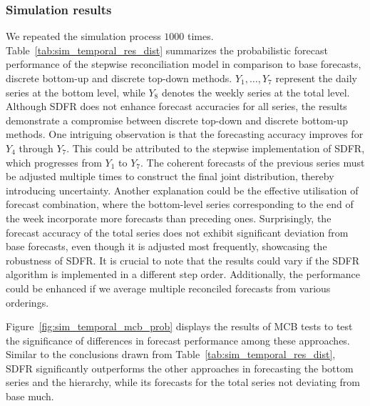 \documentclass[a4paper,review,12pt,authoryear]{elsarticle}
\begin{document}
     \subsubsection{Simulation results}
     We repeated the simulation process $1000$ times.
     Table~\ref{tab:sim_temporal_res_dist} summarizes the probabilistic forecast performance of the stepwise reconciliation model in comparison to base forecasts, discrete bottom-up and discrete top-down methods.
     $Y_1,\dots,Y_7$ represent the daily series at the bottom level, while $Y_8$ denotes the weekly series at the total level.
     Although SDFR does not enhance forecast accuracies for all series, the results
     demonstrate a compromise between discrete top-down and discrete bottom-up methods.
     One intriguing observation is that the forecasting accuracy improves for $Y_4$ through $Y_7$.
     This could be attributed to the stepwise implementation of SDFR, which progresses from $Y_1$ to $Y_7$. The coherent forecasts of the previous series must be adjusted multiple times to construct the final joint distribution, thereby introducing uncertainty.
     Another explanation could be the effective utilisation of forecast combination, where the bottom-level series corresponding to the end of the week incorporate more forecasts than preceding ones.
     Surprisingly, the forecast accuracy of the total series does not exhibit significant deviation from base forecasts,  even though it is adjusted most frequently, showcasing the robustness of SDFR.
     It is crucial to note that the results could vary if the SDFR algorithm is implemented in a different step order.
     Additionally, the performance could be enhanced if we average multiple reconciled forecasts from various orderings.

     Figure~\ref{fig:sim_temporal_mcb_prob} displays the results of MCB tests to test the significance of differences in forecast performance among these approaches. Similar to the conclusions drawn from Table~\ref{tab:sim_temporal_res_dist}, SDFR significantly outperforms the other approaches in forecasting the bottom series and the hierarchy, while its forecasts for the total series not deviating from base much.
\end{document}
